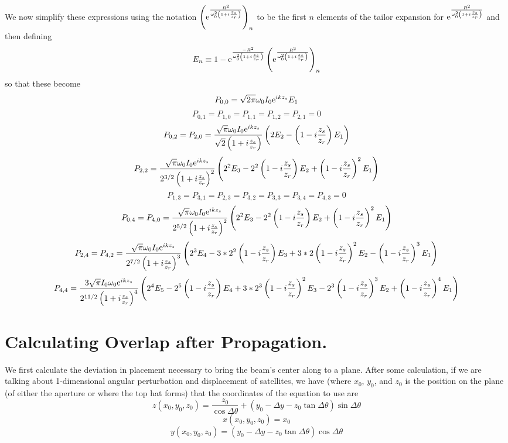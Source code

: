 \documentclass[11pt]{amsart}
\makeatletter
\newcommand{\e}{{\rm e}}				%
\newcommand{\0}{\varnothing}		%
\newcommand{\eq}{\equiv}		%
\newcommand{\1}{!}
\newcommand{\2}{@}
\newcommand{\3}{\#}
\newcommand{\4}{\$}
\newcommand{\5}{\%}
\newcommand{\6}{$^\wedge$}
\newcommand{\7}{\&}
\newcommand{\8}{*}
\newcommand{\9}{(}
\makeatother
\begin{document}
We now simplify these expressions using the notation $\left(\e^{\frac{R^2}{\omega_0^2\left(1+i\frac{z_s}{z_r}\right)}}\right)_n$ to be the first $n$ elements of the tailor expansion for $\e^{\frac{R^2}{\omega_0^2\left(1+i\frac{z_s}{z_r}\right)}}$ and then defining
\[
E_n \eq 1-\e^{\frac{-R^2}{\omega_0^2\left(1+i\frac{z_s}{z_r}\right)}}\left(\e^{\frac{R^2}{\omega_0^2\left(1+i\frac{z_s}{z_r}\right)}}\right)_n
\] so that these become
\[
P_{0,0} = \sqrt{2\pi}\omega_0 I_0\e^{ikz_s}E_1
\]
\[
P_{0,1}=P_{1,0} = P_{1,1} = P_{1,2} = P_{2,1} = 0
\]
\[
P_{0,2} = P_{2,0} = \frac{\sqrt{\pi}\omega_0I_0\e^{ikz_s}}{\sqrt{2}\left(1+i\frac{z_s}{z_r}\right)}\left(2E_2 - \left(1-i\frac{z_s}{z_r}\right)E_1\right)
\]
\[
P_{2,2} = \frac{\sqrt{\pi}\omega_0I_0\e^{ikz_s}}{2^{3/2}\left(1+i\frac{z_s}{z_r}\right)^2}\left(2^2E_3-2^2\left(1-i\frac{z_s}{z_r}\right)E_2 + \left(1-i\frac{z_s}{z_r}\right)^2E_1\right)
\]
\[
P_{1,3} = P_{3,1} = P_{2,3} = P_{3,2} = P_{3,3} = P_{3,4} = P_{4,3} = 0
\]
\[
P_{0,4} = P_{4,0} = \frac{\sqrt{\pi}\omega_0I_0\e^{ikz_s}}{2^{5/2}\left(1+i\frac{z_s}{z_r}\right)^2}\left(2^2E_3-2^2\left(1-i\frac{z_s}{z_r}\right)E_2+\left(1-i\frac{z_s}{z_r}\right)^2E_1\right)
\]
\[
P_{2,4} = P_{4,2} = \frac{\sqrt{\pi}\omega_0I_0\e^{ikz_s}}{2^{7/2}\left(1+i\frac{z_s}{z_r}\right)^3}\left(2^3E_4-3*2^2\left(1-i\frac{z_s}{z_r}\right)E_3+3*2\left(1-i\frac{z_s}{z_r}\right)^2E_2-\left(1-i\frac{z_s}{z_r}\right)^3E_1\right)
\]
\[
P_{4,4} = \frac{3\sqrt{\pi}I_0\omega_0\e^{ikz_s}}{2^{11/2}\left(1+i\frac{z_s}{z_r}\right)^4}\left(2^4E_5-2^5\left(1-i\frac{z_s}{z_r}\right)E_4+3*2^3\left(1-i\frac{z_s}{z_r}\right)^2E_3 - 2^3\left(1-i\frac{z_s}{z_r}\right)^3E_2+\left(1-i\frac{z_s}{z_r}\right)^4E_1\right)
\]
\section{Calculating Overlap after Propagation.}
We first calculate the deviation in placement necessary to bring the beam's center along  to a plane. After some calculation, if we are talking about 1-dimensional angular perturbation and displacement of satellites, we have (where $x_0$, $y_0$, and $z_0$ is the position on the plane (of either the aperture or where the top hat forms) that the coordinates of the equation to use are 
\[
z(x_0,y_0,z_0) = \frac{z_0}{\cos\Delta \theta} +\left(y_0-\Delta y - z_0\tan \Delta \theta\right) \sin \Delta \theta
\]
\[
x(x_0,y_0,z_0) = x_0
\]
\[
y(x_0,y_0,z_0) = \left(y_0-\Delta y-z_0\tan\Delta \theta\right)\cos \Delta \theta
\]
\end{document}
